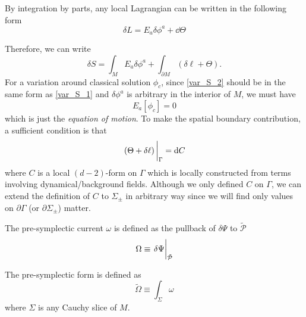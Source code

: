 \documentclass[10pt]{article}
\begin{document}
By integration by parts, any local Lagrangian can be written in the following form
\begin{equation}
    \delta L=E_a\delta \phi^a+\dd{\Theta}
\end{equation}

Therefore, we can write
\begin{equation}
    \delta S=\int_M E_a\delta\phi^a+\int_{\partial M}\left(\delta\ell+\Theta\right).\label{var_S_2}
\end{equation}
For a variation around classical solution $\phi_c$, since \cref{var_S_2} should be in the same form as \cref{var_S_1} and $\delta\phi^a$ is arbitrary in the interior of $M$, we must have
\begin{equation}
    E_a[\phi_c]=0
\end{equation}
which is just the \textit{equation of motion}.
To make the spatial boundary contribution, a sufficient condition is that
\begin{equation}\label{spatial_boundary_requirement}
    \eval{\left(\Theta+\delta\ell\right)}_\Gamma=\dd{C}
\end{equation}
where $C$ is a local $(d-2)$-form on $\Gamma$ which is locally constructed from terms involving dynamical/background fields.
Although we only defined $C$ on $\Gamma$, we can extend the definition of $C$ to $\Sigma_{\pm}$ in arbitrary way since we will find only values on $\partial\Gamma$ (or $\partial\Sigma_{\pm}$) matter.
\begin{definition}
    The pre-symplectic current $\omega$ is defined as the pullback of $\delta\Psi$ to $\tilde{\mathcal{P}}$
    \begin{equation}
        \Omega\equiv\eval{\delta\Psi}_{\tilde{\mathcal{P}}}
    \end{equation}
\end{definition}

\begin{definition}
    The pre-symplectic form is defined as 
    \begin{equation}
        \tilde{\Omega}\equiv\int_\Sigma \omega
    \end{equation}
    where $\Sigma$ is any Cauchy slice of $M$.
\end{definition}
\end{document}
